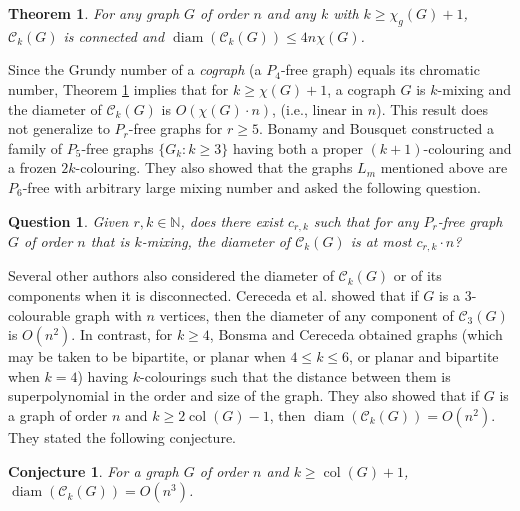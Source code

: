 \documentclass[12pt]{article}%
\newtheorem{theorem}{Theorem}[section]
\newtheorem{conjecture}{Conjecture}[section]
\newtheorem{question}{Question}[section]
\begin{document}
\begin{theorem}
\label{ThmGrundy}\emph{\cite{26CM-BB}}\hspace{0.1in}For any graph $G$ of order
$n$ and any $k$ with $k\geq\chi_{g}(G)+1$, $\mathcal{C}_{k}(G)$ is connected
and $\operatorname{diam}(\mathcal{C}_{k}(G))\leq4n\chi(G)$.
\end{theorem}

Since the Grundy number of a \emph{cograph} (a $P_{4}$-free graph) equals its
chromatic number, Theorem \ref{ThmGrundy} implies that for $k\geq\chi(G)+1$, a
cograph $G$ is $k$-mixing and the diameter of $\mathcal{C}_{k}(G)$ is
$O(\chi(G)\cdot n)$, (i.e., linear in $n$). This result does not generalize to
$P_{r}$-free graphs for $r\geq5$. Bonamy and Bousquet constructed a family of
$P_{5}$-free graphs $\{G_{k}:k\geq3\}$ having both a proper $(k+1)$-colouring
and a frozen $2k$-colouring. They also showed that the graphs $L_{m}$
mentioned above are $P_{6}$-free with arbitrary large mixing number and asked
the following question.

\begin{question}
\emph{\cite{26CM-BB}}\hspace{0.1in}Given $r,k\in\mathbb{N}$, does there exist
$c_{r,k}$ such that for any $P_{r}$-free graph $G$ of order $n$ that is
$k$-mixing, the diameter of $\mathcal{C}_{k}(G)$ is at most $c_{r,k}\cdot n$?
\end{question}

Several other authors also considered the diameter of $\mathcal{C}_{k}(G)$ or
of its components when it is disconnected. Cereceda et al. \cite{26CM-CHJ3}
showed that if $G$ is a $3$-colourable graph with $n$ vertices, then the
diameter of any component of $\mathcal{C}_{3}(G)$ is $O(n^{2})$. In contrast,
for $k\geq4$, Bonsma and Cereceda \cite{26CM-BC} obtained graphs (which may be
taken to be bipartite, or planar when $4\leq k\leq6$, or planar and bipartite
when $k=4$) having $k$-colourings such that the distance between them is
superpolynomial in the order and size of the graph. They also showed that if
$G$ is a graph of order $n$ and $k\geq2\operatorname{col}(G)-1$, then
$\operatorname{diam}(\mathcal{C}_{k}(G))=O(n^{2})$. They stated the following conjecture.

\begin{conjecture}
\emph{\cite{26CM-BC}}\hspace{0.1in}For a graph $G$ of order $n$ and
$k\geq\operatorname{col}(G)+1$, $\operatorname{diam}(\mathcal{C}%
_{k}(G))=O(n^{3})$.
\end{conjecture}
\end{document}
